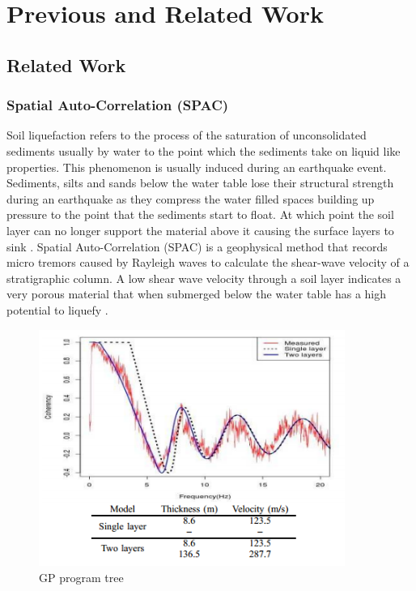 \chapter{Previous and Related Work}\label{C:us}




\section{Related Work}

\subsection{Spatial Auto-Correlation (SPAC)}
Soil liquefaction refers to the process of the saturation of unconsolidated sediments usually by water to the point which the sediments take on liquid like properties. This phenomenon is usually induced during an earthquake event. Sediments, silts and sands below the water table lose their structural strength during an earthquake as they compress the water filled spaces building up pressure to the point that the sediments start to float. At which point the soil layer can no longer support the material above it causing the surface layers to sink \cite{3} \cite{5} \cite{6}.
Spatial Auto-Correlation (SPAC) is a geophysical method that records micro tremors caused by Rayleigh waves to calculate the shear-wave velocity of a stratigraphic column. A low shear wave velocity through a soil layer indicates a very porous material that when submerged below the water table has a high potential to liquefy \cite{2} \cite{7} \cite{10}.

\begin{figure}[h]
\centering
\includegraphics[width=100mm]{simplex.png}
\caption{GP program tree}
\centering
\end{figure}

